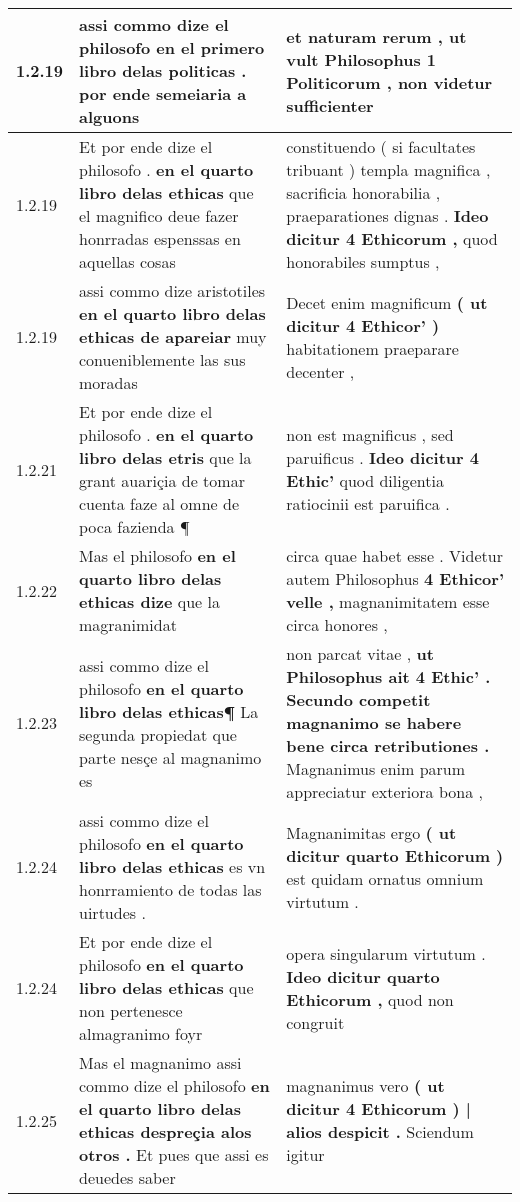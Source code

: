 \begin{tabular}{|p{1cm}|p{6.5cm}|p{6.5cm}|}
1.2.19 & assi commo dize el philosofo \textbf{ en el primero libro delas politicas . } por ende semeiaria a alguons & et naturam rerum , \textbf{ ut vult Philosophus 1 Politicorum , } non videtur sufficienter \\\hline
1.2.19 & Et por ende dize el philosofo . \textbf{ en el quarto libro delas ethicas } que el magnifico deue fazer honrradas espenssas en aquellas cosas & constituendo ( si facultates tribuant ) templa magnifica , sacrificia honorabilia , praeparationes dignas . \textbf{ Ideo dicitur 4 Ethicorum , } quod honorabiles sumptus , \\\hline
1.2.19 & assi commo dize aristotiles \textbf{ en el quarto libro delas ethicas de apareiar } muy conueniblemente las sus moradas & Decet enim magnificum \textbf{ ( ut dicitur 4 Ethicor’ ) } habitationem praeparare decenter , \\\hline
1.2.21 & Et por ende dize el philosofo . \textbf{ en el quarto libro delas etris } que la grant auariçia de tomar cuenta faze al omne de poca fazienda ¶ & non est magnificus , sed paruificus . \textbf{ Ideo dicitur 4 Ethic’ } quod diligentia ratiocinii est paruifica . \\\hline
1.2.22 & Mas el philosofo \textbf{ en el quarto libro delas ethicas dize } que la magranimidat & circa quae habet esse . Videtur autem Philosophus \textbf{ 4 Ethicor’ velle , } magnanimitatem esse circa honores , \\\hline
1.2.23 & assi commo dize el philosofo \textbf{ en el quarto libro delas ethicas¶ } La segunda propiedat que parte nesçe al magnanimo es & non parcat vitae , \textbf{ ut Philosophus ait 4 Ethic’ . Secundo competit magnanimo se habere bene circa retributiones . } Magnanimus enim parum appreciatur exteriora bona , \\\hline
1.2.24 & assi commo dize el philosofo \textbf{ en el quarto libro delas ethicas } es vn honrramiento de todas las uirtudes . & Magnanimitas ergo \textbf{ ( ut dicitur quarto Ethicorum ) } est quidam ornatus omnium virtutum . \\\hline
1.2.24 & Et por ende dize el philosofo \textbf{ en el quarto libro delas ethicas } que non pertenesce almagranimo foyr & opera singularum virtutum . \textbf{ Ideo dicitur quarto Ethicorum , } quod non congruit \\\hline
1.2.25 & Mas el magnanimo assi commo dize el philosofo \textbf{ en el quarto libro delas ethicas despreçia alos otros . } Et pues que assi es deuedes saber & magnanimus vero \textbf{ ( ut dicitur 4 Ethicorum ) | alios despicit . } Sciendum igitur \\\hline

\end{tabular}
